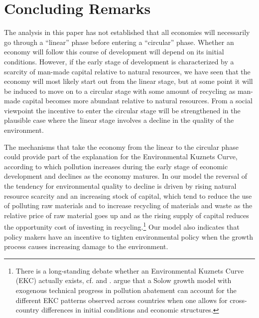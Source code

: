 \section{Concluding Remarks}
\label{sec:conclusion}

The analysis in this paper has not established that all economies will necessarily go through a ``linear'' phase before entering a ``circular'' phase. Whether an economy will follow this course of development will depend on its initial conditions. However, if the early stage of development is characterized by a scarcity of man-made capital relative to natural resources, we have seen that the economy will most likely start out from the linear stage, but at some point it will be induced to move on to a circular stage with some amount of recycling as man-made capital becomes more abundant relative to natural resources. From a social viewpoint the incentive to enter the circular stage will be strengthened in the plausible case where the linear stage involves a decline in the quality of the environment.

The mechanisms that take the economy from the linear to the circular phase could provide part of the explanation for the Environmental Kuznets Curve, according to which pollution increases during the early stage of economic development and declines as the economy matures. In our model the reversal of the tendency for environmental quality to decline is driven by rising natural resource scarcity and an increasing stock of capital, which tend to reduce the use of polluting raw materials and to increase recycling of materials and waste as the relative price of raw material goes up and as the rising supply of capital reduces the opportunity cost of investing in recycling.\footnote{There is a long-standing debate whether an Environmental Kuznets Curve (EKC) actually exists, cf. \textcite{barbier1997} and \textcite{stern2004}. \textcite{brock2010} argue that a Solow growth model with exogenous technical progress in pollution abatement can account for the different EKC patterns observed across countries when one allows for cross-country differences in initial conditions and economic structures.} Our model also indicates that policy makers have an incentive to tighten environmental policy when the growth process causes increasing damage to the environment.

